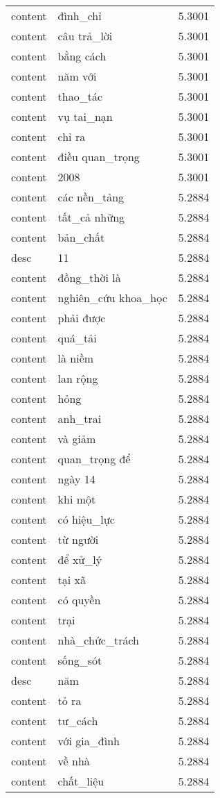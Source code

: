\documentclass{article}
\begin{document}
\begin{tabular}{lll}
content & đình\_chỉ & 5.3001\\
content & câu trả\_lời & 5.3001\\
content & bằng cách & 5.3001\\
content & năm với & 5.3001\\
content & thao\_tác & 5.3001\\
content & vụ tai\_nạn & 5.3001\\
content & chỉ ra & 5.3001\\
content & điều quan\_trọng & 5.3001\\
content & 2008 & 5.3001\\
content & các nền\_tảng & 5.2884\\
content & tất\_cả những & 5.2884\\
content & bản\_chất & 5.2884\\
desc & 11 & 5.2884\\
content & đồng\_thời là & 5.2884\\
content & nghiên\_cứu khoa\_học & 5.2884\\
content & phải được & 5.2884\\
content & quá\_tải & 5.2884\\
content & là niềm & 5.2884\\
content & lan rộng & 5.2884\\
content & hỏng & 5.2884\\
content & anh\_trai & 5.2884\\
content & và giảm & 5.2884\\
content & quan\_trọng để & 5.2884\\
content & ngày 14 & 5.2884\\
content & khi một & 5.2884\\
content & có hiệu\_lực & 5.2884\\
content & từ người & 5.2884\\
content & để xử\_lý & 5.2884\\
content & tại xã & 5.2884\\
content & có quyền & 5.2884\\
content & trại & 5.2884\\
content & nhà\_chức\_trách & 5.2884\\
content & sống\_sót & 5.2884\\
desc & năm & 5.2884\\
content & tỏ ra & 5.2884\\
content & tư\_cách & 5.2884\\
content & với gia\_đình & 5.2884\\
content & về nhà & 5.2884\\
content & chất\_liệu & 5.2884\\
\bottomrule
\end{tabular}
\end{document}
